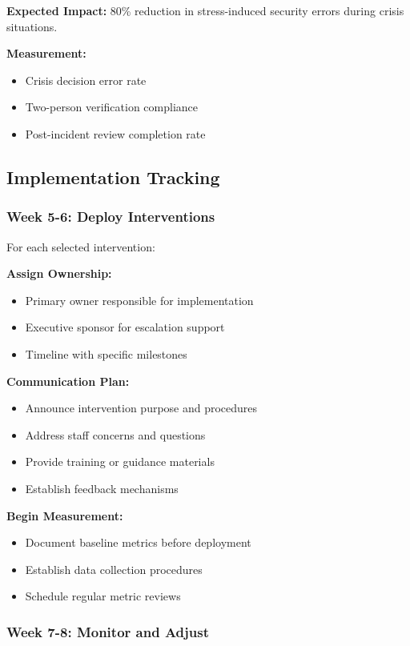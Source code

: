 \documentclass[11pt,a4paper]{article}
\begin{document}
\textbf{Expected Impact:} 80\% reduction in stress-induced security errors during crisis situations.

\textbf{Measurement:}
\begin{itemize}
\item Crisis decision error rate
\item Two-person verification compliance
\item Post-incident review completion rate
\end{itemize}

\subsection{Implementation Tracking}

\subsubsection{Week 5-6: Deploy Interventions}

For each selected intervention:

\textbf{Assign Ownership:}
\begin{itemize}
\item Primary owner responsible for implementation
\item Executive sponsor for escalation support
\item Timeline with specific milestones
\end{itemize}

\textbf{Communication Plan:}
\begin{itemize}
\item Announce intervention purpose and procedures
\item Address staff concerns and questions
\item Provide training or guidance materials
\item Establish feedback mechanisms
\end{itemize}

\textbf{Begin Measurement:}
\begin{itemize}
\item Document baseline metrics before deployment
\item Establish data collection procedures
\item Schedule regular metric reviews
\end{itemize}

\subsubsection{Week 7-8: Monitor and Adjust}
\end{document}

